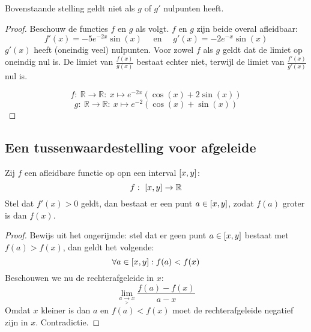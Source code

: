 \documentclass[main.tex]{subfiles}
\begin{document}
\begin{tvb}
  Bovenstaande stelling geldt niet als $g$ of $g'$ nulpunten heeft.
  
  \begin{proof}
    Beschouw de functies $f$ en $g$ als volgt.
    $f$ en $g$ zijn beide overal afleidbaar:
    \[ f'(x) = -5e^{-2x}\sin(x) \quad\text{ en }\quad g'(x) = -2e^{-x}\sin(x) \]
    $g'(x)$ heeft (oneindig veel) nulpunten.
    Voor zowel $f$ als $g$ geldt dat de limiet op oneindig nul is.   
    De limiet van $\frac{f(x)}{g(x)}$ bestaat echter niet, terwijl de limiet van $\frac{f'(x)}{g'(x)}$ nul is.
 
    \noindent
    \begin{minipage}{.45\textwidth}
    \begin{figure}[H]
      \centering
    \end{figure}
    \end{minipage}
    \begin{minipage}{.45\textwidth}
      \[ f:\ \mathbb{R} \rightarrow \mathbb{R}:\ x \mapsto e^{-2x}(\cos(x) + 2\sin(x)) \]
      \[ g:\ \mathbb{R} \rightarrow \mathbb{R}:\ x \mapsto e^{-2}(\cos(x) + \sin(x)) \]
    \end{minipage}
  \end{proof}
\end{tvb}


\subsection{Een tussenwaardestelling voor afgeleide}
\label{sec:een-tuss-voor}

\begin{lem}
  \label{lem:dalend-in-punt-dan-lager-punt-erachter}
  Zij $f$ een afleidbare functie op opn een interval $\interval{x}{y}$:
  \[ f:\ \interval{x}{y} \rightarrow \mathbb{R} \]
  Stel dat $f'(x) > 0$ geldt, dan bestaat er een punt $a\in \interval{x}{y}$, zodat $f(a)$ groter is dan $f(x)$.
  
  \begin{proof}
    Bewijs uit het ongerijmde: stel dat er geen punt $a\in \interval{x}{y}$ bestaat met $f(a)>f(x)$, dan geldt het volgende:
    \[ \forall a \in \interval{x}{y}: f(a) < f(x) \]
    Beschouwen we nu de rechterafgeleide in $x$:
    \[ \lim_{a \underset{>}{\rightarrow} x}\frac{f(a)-f(x)}{a-x} \]
    Omdat $x$ kleiner is dan $a$ en $f(a) < f(x)$ moet de rechterafgeleide negatief zijn in $x$.
    Contradictie.
  \end{proof}
\end{lem}
\end{document}
